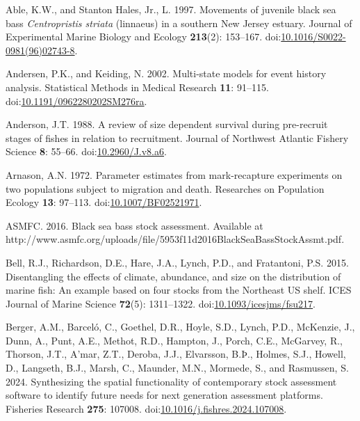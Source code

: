 \hypertarget{refs}{}
\begin{CSLReferences}{1}{0}
\leavevmode{}%
Able, K.W., and Stanton Hales, Jr., L. 1997. Movements of juvenile black sea bass \emph{{C}entropristis striata} (linnaeus) in a southern {N}ew {J}ersey estuary. Journal of Experimental Marine Biology and Ecology \textbf{213}(2): 153--167. doi:\href{https://doi.org/10.1016/S0022-0981(96)02743-8}{10.1016/S0022-0981(96)02743-8}.

\leavevmode{}%
Andersen, P.K., and Keiding, N. 2002. Multi-state models for event history analysis. Statistical Methods in Medical Research \textbf{11}: 91--115. doi:\href{https://doi.org/10.1191/0962280202SM276ra}{10.1191/0962280202SM276ra}.

\leavevmode{}%
Anderson, J.T. 1988. A review of size dependent survival during pre-recruit stages of fishes in relation to recruitment. Journal of Northwest Atlantic Fishery Science \textbf{8}: 55--66. doi:\href{https://doi.org/10.2960/J.v8.a6}{10.2960/J.v8.a6}.

\leavevmode{}%
Arnason, A.N. 1972. Parameter estimates from mark-recapture experiments on two populations subject to migration and death. Researches on Population Ecology \textbf{13}: 97--113. doi:\href{https://doi.org/10.1007/BF02521971}{10.1007/BF02521971}.

\leavevmode{}%
ASMFC. 2016. Black sea bass stock assessment. {Available} at http://www.asmfc.org/uploads/file/5953f11d2016BlackSeaBassStockAssmt.pdf.

\leavevmode{}%
Bell, R.J., Richardson, D.E., Hare, J.A., Lynch, P.D., and Fratantoni, P.S. 2015. Disentangling the effects of climate, abundance, and size on the distribution of marine fish: An example based on four stocks from the {N}ortheast {US} shelf. ICES Journal of Marine Science \textbf{72}(5): 1311--1322. doi:\href{https://doi.org/10.1093/icesjms/fsu217}{10.1093/icesjms/fsu217}.

\leavevmode{}%
Berger, A.M., Barceló, C., Goethel, D.R., Hoyle, S.D., Lynch, P.D., McKenzie, J., Dunn, A., Punt, A.E., Methot, R.D., Hampton, J., Porch, C.E., McGarvey, R., Thorson, J.T., A'mar, Z.T., Deroba, J.J., Elvarsson, B.Þ., Holmes, S.J., Howell, D., Langseth, B.J., Marsh, C., Maunder, M.N., Mormede, S., and Rasmussen, S. 2024. Synthesizing the spatial functionality of contemporary stock assessment software to identify future needs for next generation assessment platforms. Fisheries Research \textbf{275}: 107008. doi:\href{https://doi.org/10.1016/j.fishres.2024.107008}{10.1016/j.fishres.2024.107008}.


\end{CSLReferences}
